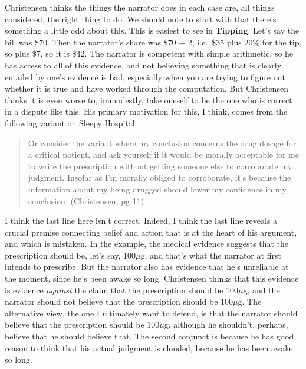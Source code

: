 \documentclass[
  11pt,
  letterpaper,
  DIV=11,
  numbers=noendperiod,
  twoside]{scrartcl}
\begin{document}
Christensen thinks the things the narrator does in each case are, all
things considered, the right thing to do. We should note to start with
that there's something a little odd about this. This is easiest to see
in \textbf{Tipping}. Let's say the bill was \$70. Then the narrator's
share was \$70 \(\div\) 2, i.e.~\$35 plus 20\% for the tip, so plus \$7,
so it is \$42. The narrator is competent with simple arithmetic, so he
has access to all of this evidence, and not believing something that is
clearly entailed by one's evidence is bad, especially when you are
trying to figure out whether it is true and have worked through the
computation. But Christensen thinks it is even worse to, immodestly,
take oneself to be the one who is correct in a dispute like this. His
primary motivation for this, I think, comes from the following variant
on Sleepy Hospital.

\begin{quote}
Or consider the variant where my conclusion concerns the drug dosage for
a critical patient, and ask yourself if it would be morally acceptable
for me to write the prescription without getting someone else to
corroborate my judgment. Insofar as I'm morally obliged to corroborate,
it's because the information about my being drugged should lower my
confidence in my conclusion. (Christensen, pg 11)
\end{quote}

I think the last line here isn't correct. Indeed, I think the last line
reveals a crucial premise connecting belief and action that is at the
heart of his argument, and which is mistaken. In the example, the
medical evidence suggests that the prescription should be, let's say,
100\(\mu\)g, and that's what the narrator at first intends to prescribe.
But the narrator also has evidence that he's unreliable at the moment,
since he's been awake so long. Christensen thinks that this evidence is
evidence \emph{against} the claim that the prescription should be
100\(\mu\)g, and the narrator should not believe that the prescription
should be 100\(\mu\)g. The alternative view, the one I ultimately want
to defend, is that the narrator should believe that the prescription
should be 100\(\mu\)g, although he shouldn't, perhaps, believe that he
should believe that. The second conjunct is because he has good reason
to think that his actual judgment is clouded, because he has been awake
so long.
\end{document}
